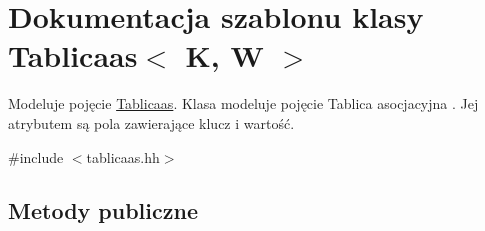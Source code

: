 \hypertarget{class_tablicaas}{\section{Dokumentacja szablonu klasy Tablicaas$<$ K, W $>$}
\label{class_tablicaas}
}


Modeluje pojęcie \hyperlink{class_tablicaas}{Tablicaas}. Klasa modeluje pojęcie Tablica asocjacyjna . Jej atrybutem są pola zawierające klucz i wartość.  




{\ttfamily \#include $<$tablicaas.\-hh$>$}

\subsection*{Metody publiczne}
